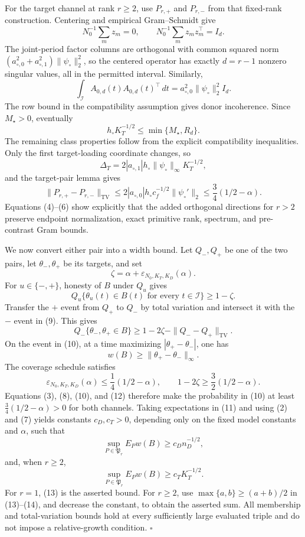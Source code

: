 For the target channel at rank \(r\ge2\), use \(P_{r,+}\) and \(P_{r,-}\)
from that fixed-rank construction.  Centering and empirical
Gram--Schmidt give
\[
 N_0^{-1}\sum_mz_m=0,
 \qquad
 N_0^{-1}\sum_mz_mz_m^\top=I_d.                             \tag{4}
\]
The joint-period factor columns are orthogonal with common squared norm
\((a_{\circ,0}^2+a_{\circ,1}^2)\|\psi_\circ\|_2^2\), so the centered
operator has exactly \(d=r-1\) nonzero singular values, all in the
permitted interval.  Similarly,
\[
 \int_{\mathcal I}A_{0,d}(t)A_{0,d}(t)^\top\,dt
 =a_{\circ,0}^2\|\psi_\circ\|_2^2 I_d.                      \tag{5}
\]
The row bound in the compatibility assumption gives donor incoherence.
Since \(M_\star>0\), eventually
\[
 h_\circ K_T^{-1/2}\le\min\{M_\star,R_d\}.                  \tag{6}
\]
The remaining class properties follow from the explicit compatibility
inequalities.  Only the first target-loading coordinate changes, so
\[
 \Delta_T
 =2|a_{\circ,1}|h_\circ\|\psi_\circ\|_\infty K_T^{-1/2},    \tag{7}
\]
and the target-pair lemma gives
\[
 \|P_{r,+}-P_{r,-}\|_{\mathrm{TV}}
 \le2|a_{\circ,0}|h_\circ c_f^{-1/2}\|\psi_\circ'\|_2
 \le\frac34(1/2-\alpha).                                    \tag{8}
\]
Equations (4)--(6) show explicitly that the added orthogonal directions for
\(r>2\) preserve endpoint normalization, exact primitive rank, spectrum,
and pre-contrast Gram bounds.

We now convert either pair into a width bound.  Let \(Q_-,Q_+\) be one of
the two pairs, let \(\theta_-,\theta_+\) be its targets, and set
\[
 \zeta=\alpha+\varepsilon_{N_0,K_T,K_D}(\alpha).
\]
For \(u\in\{-,+\}\), honesty of \(B\) under \(Q_u\) gives
\[
 Q_u\{\theta_u(t)\in B(t)\text{ for every }t\in\mathcal I\}
 \ge1-\zeta.                                                 \tag{9}
\]
Transfer the \(+\) event from \(Q_+\) to \(Q_-\) by total variation and
intersect it with the \(-\) event in (9).  This gives
\[
 Q_-\{\theta_-,\theta_+\in B\}
 \ge1-2\zeta-\|Q_--Q_+\|_{\mathrm{TV}}.                     \tag{10}
\]
On the event in (10), at a time maximizing
\(|\theta_+-\theta_-|\), one has
\[
 w(B)\ge\|\theta_+-\theta_-\|_\infty.                       \tag{11}
\]
The coverage schedule satisfies
\[
 \varepsilon_{N_0,K_T,K_D}(\alpha)
 \le\frac14(1/2-\alpha),
 \qquad
 1-2\zeta\ge\frac32(1/2-\alpha).                            \tag{12}
\]
Equations (3), (8), (10), and (12) therefore make the probability in
(10) at least \(\frac34(1/2-\alpha)>0\) for both channels.  Taking
expectations in (11) and using (2) and (7) yields constants
\(c_D,c_T>0\), depending only on the fixed model constants and \(\alpha\),
such that
\[
 \sup_{P\in\mathfrak P_r}E_Pw(B)\ge c_Dn_D^{-1/2},          \tag{13}
\]
and, when \(r\ge2\),
\[
 \sup_{P\in\mathfrak P_r}E_Pw(B)\ge c_TK_T^{-1/2}.          \tag{14}
\]
For \(r=1\), (13) is the asserted bound.  For \(r\ge2\), use
\(\max\{a,b\}\ge(a+b)/2\) in (13)--(14), and decrease the constant, to
obtain the asserted sum.  All membership and total-variation bounds hold
at every sufficiently large evaluated triple and do not impose a
relative-growth condition. \(\square\)